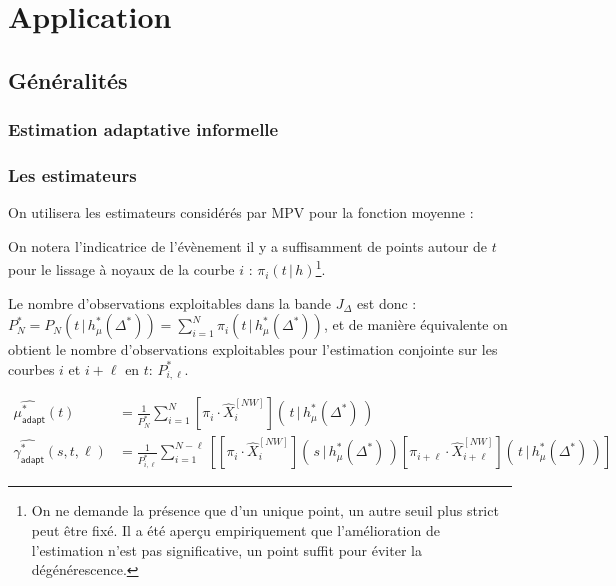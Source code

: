 \chapter{
  Application
 }
\minitoc%

\section{Généralités}

\subsection{Estimation adaptative informelle}

\subsection{Les estimateurs}


On utilisera les estimateurs considérés par MPV \cite{maissoro-SmoothnessFTSweakDep} pour la fonction moyenne :

\bigskip

\noindent On notera l'indicatrice de l'évènement \og il y a suffisamment de points autour de $t$ pour le lissage à noyaux de la courbe $i$ \fg : $\pi_i(t \, | \, h)$\footnote{On ne demande la présence que d'un unique point, un autre seuil plus strict peut être fixé. Il a été aperçu empiriquement que l'amélioration de l'estimation n'est pas significative, un point suffit pour éviter la dégénérescence.}.

\noindent Le nombre d'observations exploitables dans la bande $J_\Delta$ est donc : $P_N^* =P_N(t \, | \, h_\mu^*(\Delta^*)) = \sum\limits_{i=1}^N \pi_i(t \, | \, h_\mu^*(\Delta^*))$, et de manière équivalente on obtient le nombre d'observations exploitables pour l'estimation conjointe sur les courbes $i$ et $i + \ell$ en $t$: $P_{i,\ell}^*$.

\begin{align}
	\widehat{\mu^*_{\textsf{adapt}}}(t)              & = \frac 1 {P_N^*} \sum_{i=1}^N \left[\pi_i \cdot \widehat X^{[NW]}_i\right]\left(\, t \, | \, h^*_\mu(\Delta^*) \, \right) \\
	\widehat {\gamma^*_{\textsf{adapt}}}(s, t, \ell) & = \frac 1 {P^*_{i, \ell}}\sum_{i=1}^{N- \ell} \left[
		\left[\pi_i \cdot \widehat X^{[NW]}_i\right]\left(\, s \, | \, h^*_\mu(\Delta^*) \, \right) \left[\pi_{i + \ell} \cdot \widehat X^{[NW]}_{i + \ell}\right]\left(\, t \, | \, h^*_\mu(\Delta^*) \, \right)
		\right]                                                                                                                                                                       %
\end{align}

